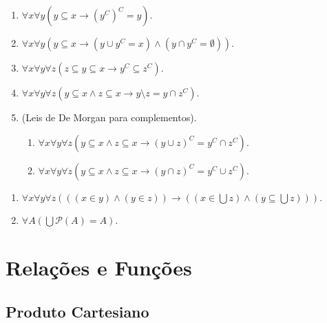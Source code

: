 \begin{proposition}
    \leavevmode
        \begin{enumerate}[leftmargin=*, align=left, label=\textbf{(\alph*)}]
            \item $\forall x \forall y (y \subseteq x \rightarrow (y^C)^C = y)$.
            \item $\forall x \forall y (y \subseteq x \rightarrow (y \cup y^C = x) \land (y \cap y^C = \emptyset))$.
            \item $\forall x \forall y \forall z (z \subseteq y \subseteq x \rightarrow y^C \subseteq z^C)$.
            \item $\forall x \forall y \forall z (y \subseteq x \land z \subseteq x \rightarrow y \setminus z = y \cap z^C)$.
            \item (Leis de De Morgan para complementos).
                \begin{enumerate}[label=\roman*.]
                    \item $\forall x \forall y \forall z (y \subseteq x \land z \subseteq x \rightarrow (y \cup z)^C = y^C \cap z^C)$.
                    \item $\forall x \forall y \forall z (y \subseteq x \land z \subseteq x \rightarrow (y \cap z)^C = y^C \cup z^C)$.
                \end{enumerate}
        \end{enumerate}
\end{proposition}

\begin{proposition}[Variadas]
    \leavevmode
        \begin{enumerate}[leftmargin=*, align=left, label=\textbf{(\alph*)}]
            \item $\forall x \forall y \forall z ( ((x \in y) \land (y \in z)) \rightarrow ( ( x \in \bigcup z) \land (y \subseteq \bigcup z)))$.
            \item $\forall A (\bigcup \mathcal{P}{(A)} = A)$.
        \end{enumerate}
\end{proposition}

\section{Relações e Funções}

\subsection{Produto Cartesiano}

